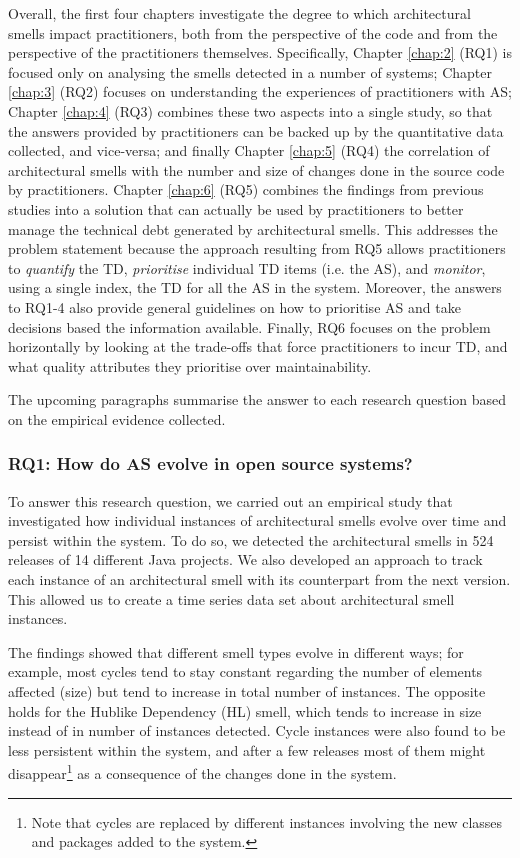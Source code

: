 Overall, the first four chapters investigate the degree to which architectural smells impact practitioners, both from the perspective of the code and from the perspective of the practitioners themselves.
Specifically, Chapter \ref{chap:2} (RQ1) is focused only on analysing the smells detected in a number of systems;
Chapter \ref{chap:3} (RQ2) focuses on understanding the experiences of practitioners with AS; Chapter \ref{chap:4} (RQ3) combines these two aspects into a single study, so that the answers provided by practitioners can be backed up by the quantitative data collected, and vice-versa; and finally Chapter \ref{chap:5} (RQ4) the correlation of architectural smells with the number and size of changes done in the source code by practitioners.
Chapter \ref{chap:6} (RQ5) combines the findings from previous studies into a solution that can actually be used by practitioners to better manage the technical debt generated by architectural smells.
This addresses the problem statement because the approach resulting from RQ5 allows practitioners to \emph{quantify} the TD, \emph{prioritise} individual TD items (i.e. the AS), and \emph{monitor}, using a single index, the TD for all the AS in the system.
Moreover, the answers to RQ1-4 also provide general guidelines on how to prioritise AS and take decisions based the information available.
Finally, RQ6 focuses on the problem horizontally by looking at the trade-offs that force practitioners to incur TD, and what quality attributes they prioritise over maintainability.

The upcoming paragraphs summarise the answer to each research question based on the empirical evidence collected.

\subsubsection*{RQ1: How do AS evolve in open source systems?}
To answer this research question, we carried out an empirical study that investigated how individual instances of architectural smells evolve over time and persist within the system.
To do so, we detected the architectural smells in 524 releases of 14 different Java projects. 
We also developed an approach to track each instance of an architectural smell with its counterpart from the next version.
This allowed us to create a time series data set about architectural smell instances.

The findings showed that different smell types evolve in different ways; for example, most cycles tend to stay constant regarding the number of elements affected (size) but tend to increase in total number of instances.
The opposite holds for the Hublike Dependency (HL) smell, which tends to increase in size instead of in number of instances detected.
Cycle instances were also found to be less persistent within the system, and after a few releases most of them might disappear\footnote{Note that cycles are replaced by different instances involving the new classes and packages added to the system.} as a consequence of the changes done in the system.

